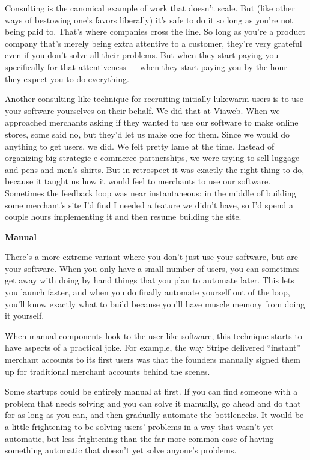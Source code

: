 Consulting is the canonical example of work that doesn't scale. But
(like other ways of bestowing one's favors liberally) it's safe to do it
so long as you're not being paid to. That's where companies cross the
line. So long as you're a product company that's merely being extra
attentive to a customer, they're very grateful even if you don't solve
all their problems. But when they start paying you specifically for that
attentiveness --- when they start paying you by the hour --- they expect
you to do everything.

Another consulting-like technique for recruiting initially lukewarm
users is to use your software yourselves on their behalf. We did that at
Viaweb. When we approached merchants asking if they wanted to use our
software to make online stores, some said no, but they'd let us make one
for them. Since we would do anything to get users, we did. We felt
pretty lame at the time. Instead of organizing big strategic e-commerce
partnerships, we were trying to sell luggage and pens and men's shirts.
But in retrospect it was exactly the right thing to do, because it
taught us how it would feel to merchants to use our software. Sometimes
the feedback loop was near instantaneous: in the middle of building some
merchant's site I'd find I needed a feature we didn't have, so I'd spend
a couple hours implementing it and then resume building the site.

\textbf{Manual}

There's a more extreme variant where you don't just use your software,
but are your software. When you only have a small number of users, you
can sometimes get away with doing by hand things that you plan to
automate later. This lets you launch faster, and when you do finally
automate yourself out of the loop, you'll know exactly what to build
because you'll have muscle memory from doing it yourself.

When manual components look to the user like software, this technique
starts to have aspects of a practical joke. For example, the way Stripe
delivered ``instant'' merchant accounts to its first users was that the
founders manually signed them up for traditional merchant accounts
behind the scenes.

Some startups could be entirely manual at first. If you can find someone
with a problem that needs solving and you can solve it manually, go
ahead and do that for as long as you can, and then gradually automate
the bottlenecks. It would be a little frightening to be solving users'
problems in a way that wasn't yet automatic, but less frightening than
the far more common case of having something automatic that doesn't yet
solve anyone's problems.

